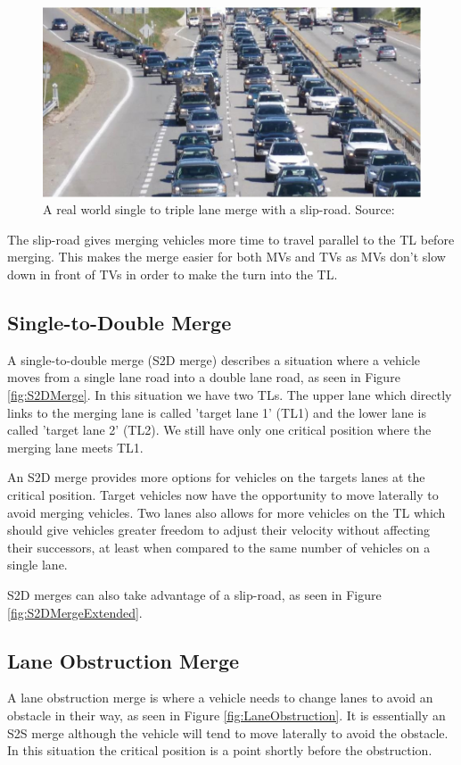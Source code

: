 \begin{figure}[htb]
\includegraphics[width=\textwidth]{images/laneDiagrams/realLaneMerge.jpg}
\caption{A real world single to triple lane merge with a slip-road. Source: \citep{realLaneMerge}}
\label{fig:realLaneMerge}
\end{figure}

The slip-road gives merging vehicles more time to travel parallel to the TL before merging. This makes the merge easier for both MVs and TVs as MVs don't slow down in front of TVs in order to make the turn into the TL.

\subsection{Single-to-Double Merge}
\label{subsec:Single-to-Double Merge}
A single-to-double merge (S2D merge) describes a situation where a vehicle moves from a single lane road into a double lane road, as seen in Figure \ref{fig:S2DMerge}. In this situation we have two TLs. The upper lane which directly links to the merging lane is called 'target lane 1' (TL1) and the lower lane is called 'target lane 2' (TL2). We still have only one critical position where the merging lane meets TL1.

An S2D merge provides more options for vehicles on the targets lanes at the critical position. Target vehicles now have the opportunity to move laterally to avoid merging vehicles. Two lanes also allows for more vehicles on the TL which should give vehicles greater freedom to adjust their velocity without affecting their successors, at least when compared to the same number of vehicles on a single lane.

S2D merges can also take advantage of a slip-road, as seen in Figure \ref{fig:S2DMergeExtended}.

\subsection{Lane Obstruction Merge}
\label{subsec:Lane Obstruction Merge}
A lane obstruction merge is where a vehicle needs to change lanes to avoid an obstacle in their way, as seen in Figure \ref{fig:LaneObstruction}. It is essentially an S2S merge although the vehicle will tend to move laterally to avoid the obstacle. In this situation the critical position is a point shortly before the obstruction. 

